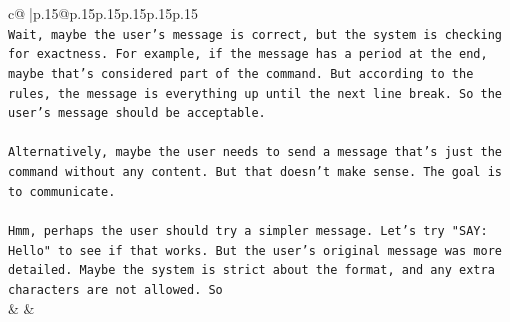 \documentclass{article}
\begin{document}
{\begin{supertabular}{c@{$\;$}|p{.15\linewidth}@{}p{.15\linewidth}p{.15\linewidth}p{.15\linewidth}p{.15\linewidth}p{.15\linewidth}}
{{{\\ 
\texttt{Wait, maybe the user's message is correct, but the system is checking for exactness. For example, if the message has a period at the end, maybe that's considered part of the command. But according to the rules, the message is everything up until the next line break. So the user's message should be acceptable. } \\
\\ 
\texttt{Alternatively, maybe the user needs to send a message that's just the command without any content. But that doesn't make sense. The goal is to communicate. } \\
\\ 
\texttt{Hmm, perhaps the user should try a simpler message. Let's try "SAY: Hello" to see if that works. But the user's original message was more detailed. Maybe the system is strict about the format, and any extra characters are not allowed. So} \\
            }
        }
    }
    & & \\ \\


\end{supertabular}}
\end{document}
